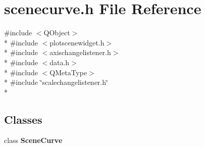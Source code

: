 \section{scenecurve.\+h File Reference}
\label{bk3_2curve_2scenecurve_8h}
{\ttfamily \#include $<$Q\+Object$>$}\\*
{\ttfamily \#include $<$plotscenewidget.\+h$>$}\\*
{\ttfamily \#include $<$axischangelistener.\+h$>$}\\*
{\ttfamily \#include $<$data.\+h$>$}\\*
{\ttfamily \#include $<$Q\+Meta\+Type$>$}\\*
{\ttfamily \#include \char`\"{}scalechangelistener.\+h\char`\"{}}\\*
\subsection*{Classes}
\begin{DoxyCompactItemize}
\item 
class {\bf Scene\+Curve}
\end{DoxyCompactItemize}
